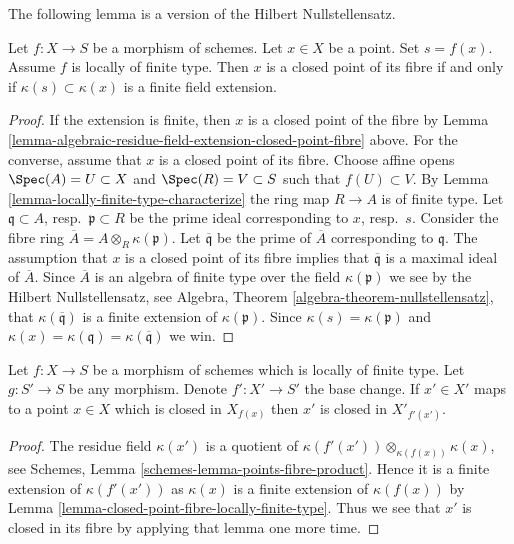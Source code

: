 \noindent
The following lemma is a version of the Hilbert Nullstellensatz.

\begin{lemma}
\label{lemma-closed-point-fibre-locally-finite-type}
Let $f : X \to S$ be a morphism of schemes.
Let $x \in X$ be a point. Set $s = f(x)$.
Assume $f$ is locally of finite type.
Then $x$ is a closed point of its fibre
if and only if $\kappa(s) \subset \kappa(x)$ is
a finite field extension.
\end{lemma}

\begin{proof}
If the extension is finite, then $x$ is a closed point of
the fibre by
Lemma \ref{lemma-algebraic-residue-field-extension-closed-point-fibre}
above. For the converse, assume that $x$ is a closed point
of its fibre. Choose affine opens $\Spec(A) = U \subset X$
and $\Spec(R) = V \subset S$ such that $f(U) \subset V$.
By Lemma \ref{lemma-locally-finite-type-characterize} the ring map
$R \to A$ is of finite type. Let $\mathfrak q \subset A$,
resp.\ $\mathfrak p \subset R$ be the prime ideal corresponding
to $x$, resp.\ $s$. Consider the fibre ring
$\overline{A} = A \otimes_R \kappa(\mathfrak p)$.
Let $\overline{\mathfrak q}$ be the prime of $\overline{A}$
corresponding to $\mathfrak q$. The assumption that $x$
is a closed point of its fibre implies that $\overline{\mathfrak q}$
is a maximal ideal of $\overline{A}$. Since $\overline{A}$
is an algebra of finite type over the field $\kappa(\mathfrak p)$
we see by the Hilbert Nullstellensatz, see
Algebra, Theorem \ref{algebra-theorem-nullstellensatz},
that $\kappa(\overline{\mathfrak q})$ is a finite extension
of $\kappa(\mathfrak p)$.
Since $\kappa(s) = \kappa(\mathfrak p)$ and
$\kappa(x) = \kappa(\mathfrak q) = \kappa(\overline{\mathfrak q})$
we win.
\end{proof}

\begin{lemma}
\label{lemma-base-change-closed-point-fibre-locally-finite-type}
Let $f : X \to S$ be a morphism of schemes which is locally of finite type.
Let $g : S' \to S$ be any morphism. Denote $f' : X' \to S'$ the base change.
If $x' \in X'$ maps to a point $x \in X$ which is closed in $X_{f(x)}$
then $x'$ is closed in $X'_{f'(x')}$.
\end{lemma}

\begin{proof}
The residue field $\kappa(x')$ is a quotient of
$\kappa(f'(x')) \otimes_{\kappa(f(x))} \kappa(x)$, see
Schemes, Lemma \ref{schemes-lemma-points-fibre-product}.
Hence it is a finite extension of $\kappa(f'(x'))$ as
$\kappa(x)$ is a finite extension of $\kappa(f(x))$ by
Lemma \ref{lemma-closed-point-fibre-locally-finite-type}.
Thus we see that $x'$ is closed in its fibre by applying that lemma
one more time.
\end{proof}

